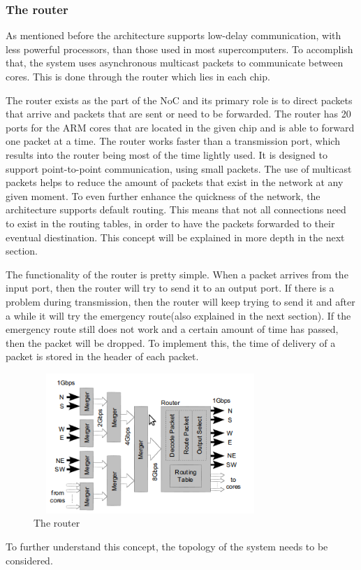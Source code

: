 \documentclass[12pt,a4paper]{article}
\begin{document}
\subsubsection{The router}
As mentioned before the architecture supports low-delay communication, with less powerful processors, than those used in most supercomputers. To accomplish that, the system uses asynchronous multicast packets to communicate between cores. This is done through the router which lies in each chip.

The router exists as the part of the NoC and its primary role is to direct packets that arrive and packets that are sent or need to be forwarded. The router has 20 ports for the ARM cores that are located in the given chip and is able to forward one packet at a time. The router works faster than a transmission port, which results into the router being most of the time lightly used. It is designed to support point-to-point communication, using small packets. The use of multicast packets helps to reduce the amount of packets that exist in the network at any given moment. To even further enhance the quickness of the network, the architecture supports default routing. This means that not all connections need to exist in the routing tables, in order to have the packets forwarded to their eventual diestination. This concept will be explained in more depth in the next section.

The functionality of the router is pretty simple. When a packet arrives from the input port, then the router will try to send it to an output port. If there is a problem during transmission, then the router will keep trying to send it and after a while it will try the emergency route(also explained in the next section). If the emergency route still does not work and a certain amount of time has passed, then the packet will be dropped. To implement this, the time of delivery of a packet is stored in the header of each packet.

\begin{figure}[h!]
\includegraphics[width=250pt,height=150pt,scale=2]{Pics/router.png}
\centering
\caption{The router\cite{navaridas2009understanding}}
\end{figure}
To further understand this concept, the topology of the system needs to be considered.
\end{document}
